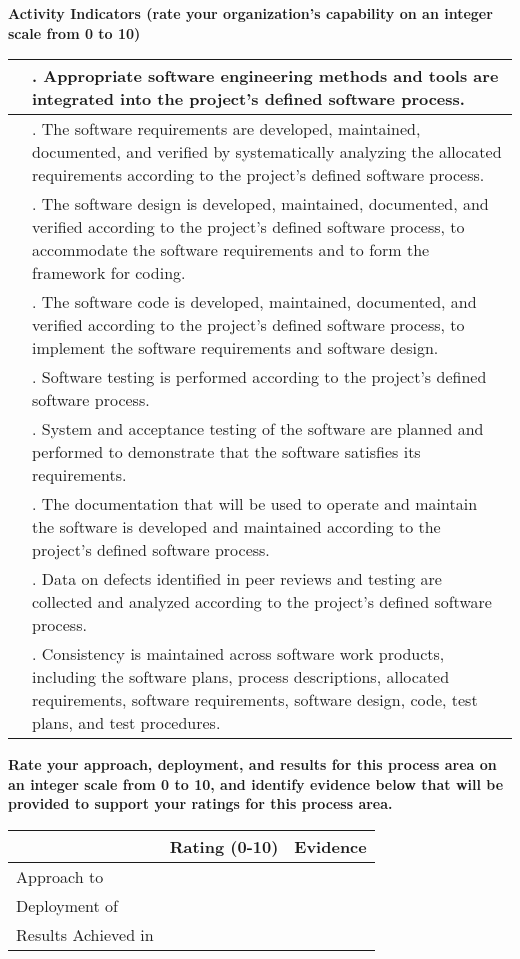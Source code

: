 \documentclass{article}
\newcommand{\KPAname}{}
\newcounter{activity}[section]		%
\newcounter{approach}[section]
\newcounter{deployment}[section]
\newcounter{result}[section]
\newcounter{score}
\newenvironment{KPAActivity}
{
    {\bf Activity Indicators (rate your organization's capability
    on an integer scale from 0 to 10)} %
    \begin{center}
    \begin{tabular}{|p{0.5in}|p{6.0in}|} \hline %
}
{
    \end{tabular}
    \end{center}
    \setcounter{approach}{\value{approach}/\value{activity}}
    \setcounter{deployment}{\value{deployment}/\value{activity}}
    \setcounter{result}{\value{result}/\value{activity}}
}
\newcommand{\Activity}[4]
{
    \stepcounter{activity} 
    \setcounter{score}{(#1+#2+#3)/3}
    \setcounter{approach}{\value{approach}+#1}
    \setcounter{deployment}{\value{deployment}+#1}
    \setcounter{result}{\value{result}+#1}
    \arabic{score} & \arabic{activity}. #4 \\ \hline
} %
\newenvironment{KPARate}
{
    {\bf Rate your approach, deployment, and results for
    this process area on an integer scale from 0 to 10, and 
    identify evidence below that will be provided to support your
    ratings for this process area.}
    \begin{center}
    \begin{tabular}{|p{1.0in}|p{0.5in}|p{5.0in}|} \hline
    & Rating (0-10) & \multicolumn{1}{c|}{Evidence} \\ \hline
}
{
    \end{tabular}
    \end{center}
}
\newcommand{\Approach}[1]
{
    Approach to \KPAname & \arabic{approach} & #1 \\ \hline
}
\newcommand{\Deployment}[1]
{
    Deployment of \KPAname & \arabic{deployment} & #1 \\ \hline
}
\newcommand{\Results}[1]
{
    Results Achieved in \KPAname & \arabic{result} & #1 \\ \hline
}
\begin{document}
\begin{KPAActivity}
\Activity{3}{3}{3}{Appropriate software engineering methods and tools are
integrated into the project's defined software process.}
\Activity{2}{2}{2}{The software requirements are developed, maintained,
documented, and verified by systematically analyzing the allocated
requirements according to the project's defined software process.}
\Activity{2}{2}{2}{The software design is developed, maintained, documented,
and verified according to the project's defined software process, to
accommodate the software requirements and to form the framework for
coding.}
\Activity{2}{2}{2}{The software code is developed, maintained, documented,
and verified according to the project's defined software process, to
implement the software requirements and software design.}
\Activity{3}{3}{3}{Software testing is performed according to the project's
defined software process.}
\Activity{3}{3}{3}{System and acceptance testing of the software are planned
and performed to demonstrate that the software satisfies its
requirements.}
\Activity{3}{3}{3}{The documentation that will be used to operate and
maintain the software is developed and maintained according to the
project's defined software process.}
\Activity{0}{0}{0}{Data on defects identified in peer reviews and testing are
collected and analyzed according to the project's defined software
process.}
\Activity{3}{3}{3}{Consistency is maintained across software work products,
including the software plans, process descriptions, allocated
requirements, software requirements, software design, code, test
plans, and test procedures.}
\end{KPAActivity}

\begin{KPARate}
\Approach{}
\Deployment{}
\Results{}
\end{KPARate}
\end{document}
